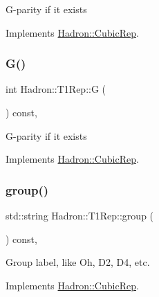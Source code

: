 G-\/parity if it exists 

Implements \mbox{\hyperlink{structHadron_1_1CubicRep_a52104e43266d1614c00bbd1c3b395458}{Hadron\+::\+Cubic\+Rep}}.

\mbox{\label{structHadron_1_1T1Rep_a824c17669ccaf2513c03a3b41a25108e}} 
\subsubsection{\texorpdfstring{G()}{G()}\hspace{0.1cm}{\footnotesize\ttfamily [2/2]}}
{\footnotesize\ttfamily int Hadron\+::\+T1\+Rep\+::G (\begin{DoxyParamCaption}{ }\end{DoxyParamCaption}) const\hspace{0.3cm}{\ttfamily [inline]}, {\ttfamily [virtual]}}

G-\/parity if it exists 

Implements \mbox{\hyperlink{structHadron_1_1CubicRep_a52104e43266d1614c00bbd1c3b395458}{Hadron\+::\+Cubic\+Rep}}.

\mbox{\label{structHadron_1_1T1Rep_a92f0ff47781bd3fd98054295d9a42f3a}} 
\subsubsection{\texorpdfstring{group()}{group()}\hspace{0.1cm}{\footnotesize\ttfamily [1/2]}}
{\footnotesize\ttfamily std\+::string Hadron\+::\+T1\+Rep\+::group (\begin{DoxyParamCaption}{ }\end{DoxyParamCaption}) const\hspace{0.3cm}{\ttfamily [inline]}, {\ttfamily [virtual]}}

Group label, like Oh, D2, D4, etc. 

Implements \mbox{\hyperlink{structHadron_1_1CubicRep_a0748f11ec87f387062c8e8981339a29c}{Hadron\+::\+Cubic\+Rep}}.

\mbox{\label{structHadron_1_1T1Rep_a92f0ff47781bd3fd98054295d9a42f3a}} 
